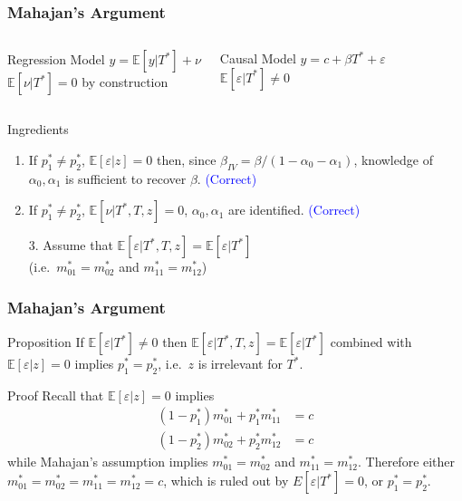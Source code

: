 \documentclass{beamer}
\begin{document}
\begin{frame}
  \frametitle{Mahajan's Argument}
    \begin{columns}[c]
    \begin{exampleblock}{Regression Model}
      $y = \mathbb{E}[y|T^*] + \nu$\\
      {\small $\mathbb{E}[\nu|T^*]=0$ by construction}
    \end{exampleblock}
    \begin{exampleblock}{Causal Model}
     $y = c + \beta T^* + \varepsilon$\\
     {\small$\mathbb{E}[\varepsilon|T^*]\neq 0$}
    \end{exampleblock}
    \end{columns}

    \vspace{0.7em}

    \begin{block}{Ingredients}
      
  \begin{enumerate}
    \item If $p^*_1 \neq p^*_2$, $\mathbb{E}[\varepsilon|z]=0$ then, since $\beta_{IV} = \beta/(1-\alpha_0-\alpha_1)$, knowledge of $\alpha_0,\alpha_1$ is sufficient to recover $\beta$. \textcolor{blue}{(Correct)}
    \item If $p^*_1 \neq p^*_2$, $\mathbb{E}[\nu|T^*,T,z]=0$, $\alpha_0, \alpha_1$ are identified. \textcolor{blue}{(Correct)}
    \item[] \alert{}
    \item[3.] Assume that $\mathbb{E}[\varepsilon|T^*,T,z]=\mathbb{E}[\varepsilon|T^*]$ \\ {\small (i.e.\ $m_{01}^* = m_{02}^*$ and $m_{11}^*=m_{12}^*$)}
  \end{enumerate}
    \end{block}
\end{frame}
\begin{frame}
  \frametitle{Mahajan's Argument}
  \begin{block}{Proposition}
    If $\mathbb{E}[\varepsilon|T^*]\neq 0$ then  $\mathbb{E}[\varepsilon|T^*,T,z]=\mathbb{E}[\varepsilon|T^*]$ combined with $\mathbb{E}[\varepsilon|z]=0$ implies $p^*_1 = p^*_2$, i.e.\ $z$ is irrelevant for $T^*$.
  \end{block}
  \begin{block}{Proof}
    Recall that $\mathbb{E}[\varepsilon|z]=0$ implies
  \begin{align*}
     (1-p_1^*) m^*_{01} + p^*_1 m^*_{11}&=c\\
     (1-p_2^*) m^*_{02} + p^*_2 m^*_{12}&=c
  \end{align*}
  while Mahajan's assumption implies $m_{01}^* = m_{02}^*$ and $m_{11}^*=m_{12}^*$.
  Therefore either $m_{01}^*=m_{02}^* = m_{11}^* =m_{12}^*=c$, which is ruled out by $E[\varepsilon|T^*]=0$, or $p^*_1 = p^*_2$.
  \end{block}
\end{frame}
\end{document}
